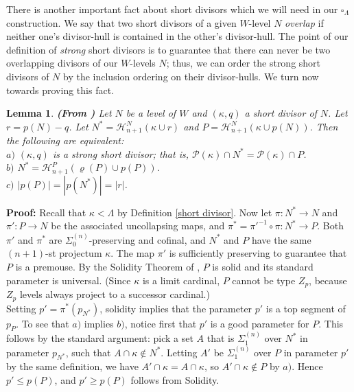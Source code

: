 \documentclass[12pt]{article}
\newtheorem{lem}[thm]{Lemma}
\begin{document}
There is another important fact about short divisors which we will need in our $\square_\Lambda$ construction.  We say that two short divisors of a given $W$-level $N$ \textit{overlap} if neither one's divisor-hull is contained in the other's divisor-hull.  The point of our definition of \textit{strong} short divisors is to guarantee that there can never be two overlapping divisors of our $W$-levels $N$; thus, we can order the strong short divisors of $N$ by the inclusion ordering on their divisor-hulls.  We turn now towards proving this fact.\\


\begin{lem} \label{characterization of strongness}
\textbf{(From \cite{zeman square proof})}
Let $N$ be a level of $W$ and $(\kappa , q)$ a short divisor of $N$.  Let $r = p(N) - q$.  Let $N^* = \mathcal{H}_{n+1}^N ( \kappa \cup r )$ and $P =  \mathcal{H}_{n+1}^N ( \kappa \cup p(N) )$.  Then the following are equivalent:\\

$a)$ $(\kappa , q)$ is a strong short divisor; that is, $\mathcal{P} (\kappa ) \cap N^* = \mathcal{P} (\kappa ) \cap P$.\\

$b)$ $N^* = \mathcal{H}_{n+1}^{P} (\varrho (P) \cup p(P) )$.\\

$c)$ $| p(P)| = | p (N^*) | = |r|$.
\end{lem}

\textbf{Proof:}  Recall that $\kappa < \Lambda$ by Definition \ref{short divisor}.  Now let $\pi : N^* \longrightarrow N$ and $\pi' : P \longrightarrow N$ be the associated uncollapsing maps, and $\pi^* = \pi'^{-1} \circ \pi : N^* \longrightarrow P$.  Both $\pi'$ and $\pi^*$ are $\Sigma_0^{(n)}$-preserving and cofinal, and $N^*$ and $P$ have the same $(n+1)$-st projectum $\kappa$.  The map $\pi'$ is sufficiently preserving to guarantee that $P$ is a premouse.  By the Solidity Theorem of \cite{FSPIPM}, $P$ is solid and its standard parameter is universal. (Since $\kappa$ is a limit cardinal, $P$ cannot be type $Z_p$, because $Z_p$ levels always project to a successor cardinal.)\\

Setting $p' = \pi^* (p_{N^*})$, solidity implies that the parameter $p'$ is a top segment of $p_{P}$.  To see that $a)$ implies $b)$, notice first that $p'$ is a good parameter for $P$.  This follows by the standard argument: pick a set $A$ that is $\Sigma_1^{(n)}$ over $N^*$ in parameter $p_{N^*}$, such that $A \cap \kappa \notin N^*$.  Letting $A'$ be $\Sigma_1^{(n)}$ over $P$ in parameter $p'$ by the same definition, we have $A' \cap \kappa = A \cap \kappa$, so $A' \cap \kappa \notin P$ by $a)$.  Hence $p' \leq p (P )$, and $p' \geq p (P)$ follows from Solidity.\\
\end{document}
